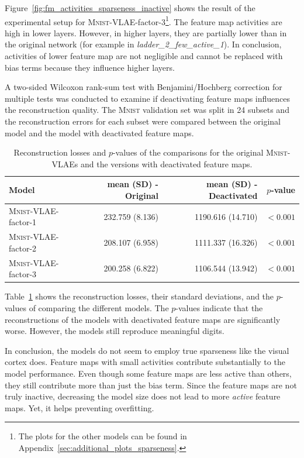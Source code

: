 Figure~\ref{fig:fm_activities_sparseness_inactive} shows the result of the experimental setup for \textsc{Mnist}-\ac{VLAE}-factor-3\footnote{The plots for the other models can be found in Appendix~\ref{sec:additional_plots_sparseness}.}.
The feature map activities are high in lower layers.
However, in higher layers, they are partially lower than in the original network (for example in \textit{ladder\_2\_few\_active\_1}).
In conclusion, activities of lower feature map are not negligible and cannot be replaced with bias terms because they influence higher layers.

A two-sided Wilcoxon rank-sum test with Benjamini/Hochberg correction for multiple tests was conducted to examine if deactivating feature maps influences the reconstruction quality.
The \textsc{Mnist} validation set was split in 24 subsets and the reconstruction errors for each subset were compared between the original model and the model with deactivated feature maps.
\begin{table}
    \centering
    \begin{tabular}{lrrr}
        \toprule
        Model                             & mean (SD) - Original & mean (SD) - Deactivated & $p$-value \\
        \midrule
        \textsc{Mnist}-\ac{VLAE}-factor-1 & 232.759 (8.136)      & 1190.616 (14.710)       & $< 0.001$ \\
        \textsc{Mnist}-\ac{VLAE}-factor-2 & 208.107 (6.958)      & 1111.337 (16.326)       & $< 0.001$ \\
        \textsc{Mnist}-\ac{VLAE}-factor-3 & 200.258 (6.822)      & 1106.544 (13.942)       & $< 0.001$ \\
        \bottomrule
    \end{tabular}
    \caption[\textsc{Mnist}-VLAEs: Reconstruction Losses]{Reconstruction losses and $p$-values of the comparisons for the original \textsc{Mnist}-\acp{VLAE} and the versions with deactivated feature maps.}
    \label{tab:factor-mnists-reconstr}
\end{table}
Table~\ref{tab:factor-mnists-reconstr} shows the reconstruction losses, their standard deviations, and the $p$-values of comparing the different models.
The $p$-values indicate that the reconstructions of the models with deactivated feature maps are significantly worse.
However, the models still reproduce meaningful digits.

In conclusion, the models do not seem to employ true sparseness like the visual cortex does.
Feature maps with small activities contribute substantially to the model performance.
Even though some feature maps are less active than others, they still contribute more than just the bias term.
Since the feature maps are not truly inactive, decreasing the model size does not lead to more \textit{active} feature maps.
Yet, it helps preventing overfitting.

